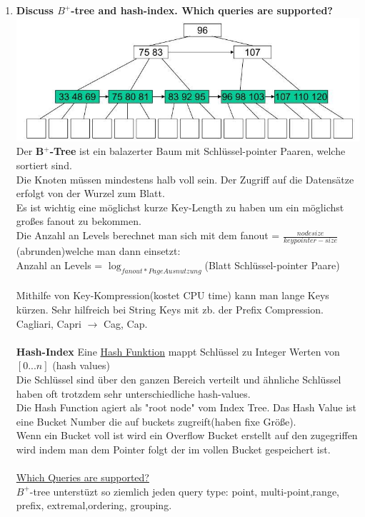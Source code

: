 \documentclass[12pt]{article}\pagestyle{myheadings}
\theoremstyle{plain}
\begin{document}
\begin{enumerate}
\item \textbf{Discuss $B^+$-tree and hash-index. Which queries are supported?}\\
\includegraphics[scale=0.7]{BplusTree.jpg}
Der \textbf{B$^+$-Tree} ist ein balazerter Baum mit Schlüssel-pointer Paaren, welche sortiert sind.\\
Die Knoten müssen mindestens halb voll sein.
Der Zugriff auf die Datensätze erfolgt von der Wurzel zum Blatt.\\
Es ist wichtig eine möglichst kurze Key-Length zu haben um ein möglichst großes fanout zu bekommen.\\
Die Anzahl an Levels berechnet man sich mit dem fanout = $\frac{nodesize}{keypointer-size}$ (abrunden)welche man dann einsetzt:\\
Anzahl an Levels = $\log_{fanout*Page Ausnutzung}$(Blatt Schlüssel-pointer Paare)\\
\\Mithilfe von Key-Kompression(kostet CPU time) kann man lange Keys kürzen.
Sehr hilfreich bei String Keys mit zb. der Prefix Compression.\\Cagliari, Capri $\rightarrow$ Cag, Cap.\\ \\
\textbf{Hash-Index} Eine \underline{Hash Funktion} mappt Schlüssel zu Integer Werten von $[0...n]$ (hash values)\\
Die Schlüssel sind über den ganzen Bereich verteilt und ähnliche Schlüssel haben oft trotzdem sehr unterschiedliche hash-values.\\
Die Hash Function agiert als "root node" vom Index Tree. Das Hash Value ist eine Bucket Number die auf buckets zugreift(haben fixe Größe).\\ Wenn ein Bucket voll ist wird ein Overflow Bucket erstellt auf den zugegriffen wird indem man dem Pointer folgt der im vollen Bucket gespeichert ist.\\ \\
\underline{Which Queries are supported?}\\
$B^+$-tree unterstüzt so ziemlich jeden query type: point, multi-point,range, prefix, extremal,ordering, grouping.

\end{enumerate}
\end{document}
